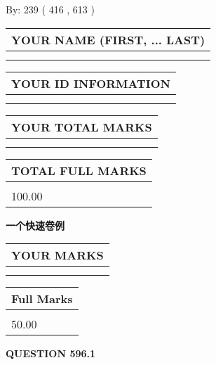 \documentclass{ctexart}
\begin{document}
   
\hspace{1.0in} By: 
 239 ( 416 ,  613 )
   
   
   
   
\newpage 
\setcounter{page}{ 
   596001 } 
   
   
   
   
\noindent\begin{tabular}{|l|}
\hline
YOUR NAME (FIRST, ... LAST)  \\
\hline
 \\ 
 \\ 
\hline
\end{tabular}
\hspace{0.05in} \begin{tabular}{|l|}
\hline
 YOUR   ID   INFORMATION  \\
\hline
 \\ 
 \\ 
\hline
\end{tabular}
   
   
\vspace{0.2in}\noindent\begin{tabular}{|l|}
\hline
YOUR TOTAL MARKS  \\
\hline
 \\ 
 \\ 
\hline
\end{tabular}
\hspace{0.05in} \begin{tabular}{|l|}
\hline
TOTAL FULL MARKS  \\
\hline
 \\ 
100.00 \\
\hline
\end{tabular}
   
   
 \vspace{0.2in}
{\LARGE {\textbf{ 一个快速卷例}}}
   
   
  
\vspace{0.2in}
  
\noindent\begin{tabular}{|l|}
\hline
 YOUR MARKS  \\
\hline
 \\ 
 \\ 
\hline
\end{tabular}
\hspace{0.05in} \begin{tabular}{|l|}
\hline
 Full Marks  \\
\hline
 \\ 
50.00 \\
\hline
\end{tabular}
{\textbf{\Large{QUESTION
596.1 
}}}
  
\end{document}
